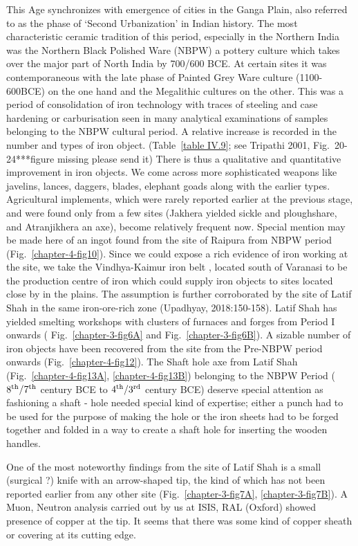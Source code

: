 This Age synchronizes with emergence of cities in the Ganga Plain, also referred to as the phase of ‘Second Urbanization’ in Indian history. The most characteristic ceramic tradition of this period, especially in the Northern India was the Northern Black Polished Ware (NBPW) a pottery culture which takes over the major part of North India by 700/600 BCE. At certain sites it was contemporaneous with the late phase of Painted Grey Ware culture (1100-600BCE) on the one hand and the Megalithic cultures on the other. This was a period of consolidation of iron technology with traces of steeling and case hardening or carburisation seen in many analytical examinations of samples belonging to the NBPW cultural period. A relative increase is recorded in the number and types of iron object. (Table~\ref{table IV.9}; see Tripathi 2001, Fig.~20-24***figure missing please send it) There is thus a qualitative and quantitative improvement in iron objects. We come across more sophisticated weapons like javelins, lances, daggers, blades, elephant goads along with the earlier types. Agricultural implements, which were rarely reported earlier at the previous stage, and were found only from a few sites (Jakhera yielded sickle and ploughshare, and Atranjikhera an axe), become relatively frequent now. Special mention may be made here of an ingot found from the site of Raipura from NBPW period (Fig.~\ref{chapter-4-fig10}). Since we could expose a rich evidence of iron working at the site, we take the Vindhya-Kaimur iron belt , located south of Varanasi to be the production centre of iron which could supply iron objects to sites located close by in the plains. The assumption is further corroborated by the site of Latif Shah in the same iron-ore-rich zone (Upadhyay, 2018:150-158). Latif  Shah  has yielded smelting workshops with clusters of furnaces and forges from Period I onwards ( Fig.~\ref{chapter-3-fig6A} and  Fig.~\ref{chapter-3-fig6B}). A sizable number of iron objects have been recovered from the site from the Pre-NBPW period onwards (Fig.~\ref{chapter-4-fig12}). The Shaft hole axe from Latif Shah (Fig.~\ref{chapter-4-fig13A}, \ref{chapter-4-fig13B}) belonging to the NBPW Period ($8^{\rm th}/7^{\rm th}$ century BCE to $4^{\rm th}/3^{\rm rd}$ century BCE) deserve special attention as fashioning a shaft - hole needed special kind of expertise; either a punch had to be used for the purpose of making the hole or the iron sheets had to be forged together and folded in a way to create a shaft hole for inserting the wooden handles. 

One of the most noteworthy findings from the site of Latif Shah is a small (surgical ?) knife with an arrow-shaped tip, the kind of which has not been reported earlier from any other site (Fig.~\ref{chapter-3-fig7A}, \ref{chapter-3-fig7B}). A Muon, Neutron analysis carried out by us at ISIS, RAL (Oxford) showed presence of copper at the tip. It seems that there was some kind of copper sheath or covering at its cutting edge. 

